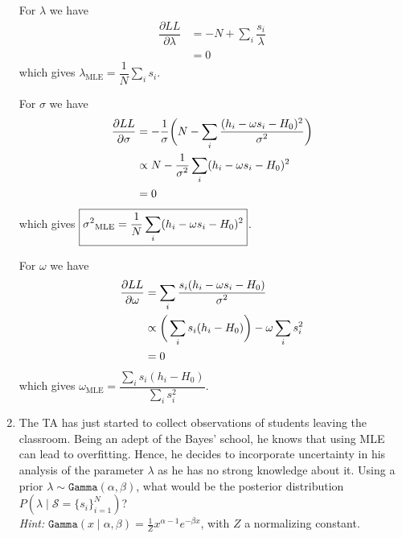 \documentclass[11pt, a4paper]{article}
\begin{document}
\begin{enumerate}
\begin{solution}
        For $\lambda$ we have
        \begin{align*}
            \dfrac{\partial LL}{\partial \lambda} &= -N + \sum_i \dfrac{s_i}{\lambda}\\
            &= 0
        \end{align*}
        which gives $\boxed{\lambda_{\text{MLE}} = \dfrac{1}{N}\sum_i s_i}$. 

        For $\sigma$ we have
        \begin{align*}
            \dfrac{\partial LL}{\partial \sigma} &= -\dfrac{1}{\sigma}\bigg(N -\sum_i \dfrac{(h_i - \omega s_i - H_0)^2}{\text{$\sigma^2$}}\bigg)\\
            &\propto N -\dfrac{1}{\text{$\sigma^2$}}\sum_i (h_i - \omega s_i - H_0)^2\\
            &= 0
        \end{align*}
        which gives $\boxed{\text{$\sigma^2$}_{\text{MLE}} = \dfrac{1}{N}\sum_i (h_i - \omega s_i - H_0)^2}$.

        For $\omega$ we have
        \begin{align*}
            \dfrac{\partial LL}{\partial \omega} &= \sum_i \dfrac{s_i(h_i - \omega s_i - H_0)}{\text{$\sigma^2$}}\\
            &\propto \bigg(\sum_i s_i(h_i - H_0)\bigg) - \omega\sum_i s_i^2\\
            &= 0
        \end{align*}
        which gives $\boxed{\omega_{\text{MLE}} = \dfrac{\sum_i s_i(h_i - H_0)}{\sum_i s_i^2}}$.
        
    \end{solution} 
    \item The TA has just started to collect observations of students leaving the classroom. Being an adept of the Bayes' school, he knows that using MLE can lead to overfitting. Hence, he decides to incorporate uncertainty in his analysis of the parameter $\lambda$ as he has no strong knowledge about it. Using a prior $\lambda \sim \texttt{Gamma}(\alpha, \beta)$, what would be the posterior distribution $P(\lambda \mid \mathcal{S} = \{s_i\}_{i=1}^N)$?\\
    
    \textit{Hint:} $\texttt{Gamma}(x \mid \alpha, \beta) = \frac{1}{Z}x^{\alpha - 1} e^{-\beta x}$, with $Z$ a normalizing constant.
    

\end{enumerate}
\end{document}
